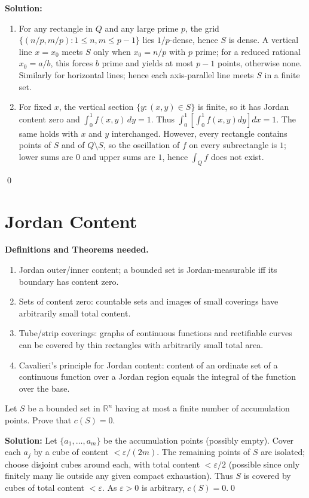 \bigskip\noindent\textbf{Solution:}
\begin{enumerate}[label=(\alph*)]
    \item For any rectangle in $Q$ and any large prime $p$, the grid $\{(n/p,m/p):1\le n,m\le p-1\}$ lies $1/p$-dense, hence $S$ is dense. A vertical line $x=x_0$ meets $S$ only when $x_0=n/p$ with $p$ prime; for a reduced rational $x_0=a/b$, this forces $b$ prime and yields at most $p-1$ points, otherwise none. Similarly for horizontal lines; hence each axis-parallel line meets $S$ in a finite set.
    \item For fixed $x$, the vertical section $\{y:(x,y)\in S\}$ is finite, so it has Jordan content zero and $\int_0^1 f(x,y)\,dy=1$. Thus $\int_0^1\![\int_0^1 f(x,y)dy]dx=1$. The same holds with $x$ and $y$ interchanged. However, every rectangle contains points of $S$ and of $Q\setminus S$, so the oscillation of $f$ on every subrectangle is $1$; lower sums are $0$ and upper sums are $1$, hence $\int_Q f$ does not exist.
\end{enumerate}\qed
\section{Jordan Content}
\noindent\textbf{Definitions and Theorems needed.}
\begin{enumerate}[label=(\roman*)]
    \item Jordan outer/inner content; a bounded set is Jordan-measurable iff its boundary has content zero.
    \item Sets of content zero: countable sets and images of small coverings have arbitrarily small total content.
    \item Tube/strip coverings: graphs of continuous functions and rectifiable curves can be covered by thin rectangles with arbitrarily small total area.
    \item Cavalieri’s principle for Jordan content: content of an ordinate set of a continuous function over a Jordan region equals the integral of the function over the base.
\end{enumerate}



\begin{problembox}
Let \( S \) be a bounded set in \( \mathbb{R}^n \) having at most a finite number of accumulation points. Prove that \( c(S) = 0 \).
\end{problembox}

\bigskip\noindent\textbf{Solution:}
Let $\{a_1,\dots,a_m\}$ be the accumulation points (possibly empty). Cover each $a_j$ by a cube of content $<\varepsilon/(2m)$. The remaining points of $S$ are isolated; choose disjoint cubes around each, with total content $<\varepsilon/2$ (possible since only finitely many lie outside any given compact exhaustion). Thus $S$ is covered by cubes of total content $<\varepsilon$. As $\varepsilon>0$ is arbitrary, $c(S)=0$.\qed


